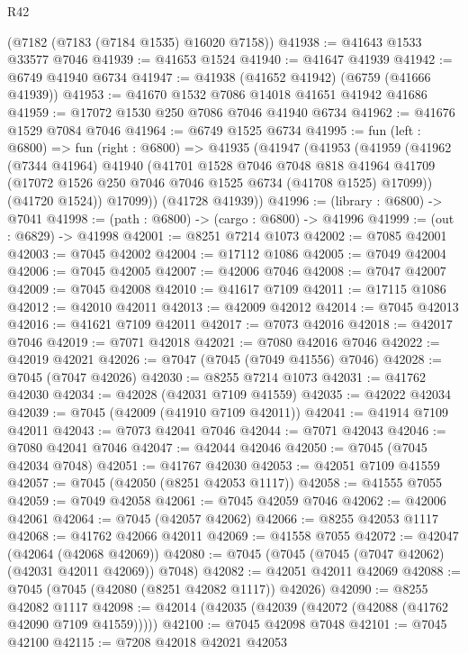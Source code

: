 \begin{lexlean}{R42}
\begin{coremodule}
{    (@7182 (@7183 (@7184 @1535) @16020 @7158))
@41938 := @41643 @1533 @33577 @7046
@41939 := @41653 @1524
@41940 := @41647 @41939
@41942 := @6749 @41940 @6734
@41947 := @41938 (@41652 @41942) (@6759 (@41666 @41939))
@41953 := @41670 @1532 @7086 @14018 @41651 @41942 @41686
@41959 := @17072 @1530 @250 @7086 @7046 @41940 @6734
@41962 := @41676 @1529 @7084 @7046
@41964 := @6749 @1525 @6734
@41995 := fun (left : @6800) =>
  fun (right : @6800) =>
  @41935
    (@41947
      (@41953
        (@41959
          (@41962
            (@7344 @41964)
            @41940
            (@41701
              @1528
              @7046
              @7048
              @818
              @41964
              @41709
              (@17072 @1526 @250 @7046 @7046 @1525 @6734 (@41708 @1525) @17099))
            (@41720 @1524))
          @17099))
      (@41728 @41939))
@41996 := (library : @6800) -> @7041
@41998 := (path : @6800) -> (cargo : @6800) -> @41996
@41999 := (out : @6829) -> @41998
@42001 := @8251 @7214 @1073
@42002 := @7085 @42001
@42003 := @7045 @42002
@42004 := @17112 @1086
@42005 := @7049 @42004
@42006 := @7045 @42005
@42007 := @42006 @7046
@42008 := @7047 @42007
@42009 := @7045 @42008
@42010 := @41617 @7109
@42011 := @17115 @1086
@42012 := @42010 @42011
@42013 := @42009 @42012
@42014 := @7045 @42013
@42016 := @41621 @7109 @42011
@42017 := @7073 @42016
@42018 := @42017 @7046
@42019 := @7071 @42018
@42021 := @7080 @42016 @7046
@42022 := @42019 @42021
@42026 := @7047 (@7045 (@7049 @41556) @7046)
@42028 := @7045 (@7047 @42026)
@42030 := @8255 @7214 @1073
@42031 := @41762 @42030
@42034 := @42028 (@42031 @7109 @41559)
@42035 := @42022 @42034
@42039 := @7045 (@42009 (@41910 @7109 @42011))
@42041 := @41914 @7109 @42011
@42043 := @7073 @42041 @7046
@42044 := @7071 @42043
@42046 := @7080 @42041 @7046
@42047 := @42044 @42046
@42050 := @7045 (@7045 @42034 @7048)
@42051 := @41767 @42030
@42053 := @42051 @7109 @41559
@42057 := @7045 (@42050 (@8251 @42053 @1117))
@42058 := @41555 @7055
@42059 := @7049 @42058
@42061 := @7045 @42059 @7046
@42062 := @42006 @42061
@42064 := @7045 (@42057 @42062)
@42066 := @8255 @42053 @1117
@42068 := @41762 @42066 @42011
@42069 := @41558 @7055
@42072 := @42047 (@42064 (@42068 @42069))
@42080 := @7045 (@7045 (@7045 (@7047 @42062) (@42031 @42011 @42069)) @7048)
@42082 := @42051 @42011 @42069
@42088 := @7045 (@7045 (@42080 (@8251 @42082 @1117)) @42026)
@42090 := @8255 @42082 @1117
@42098 := @42014 (@42035 (@42039 (@42072 (@42088 (@41762 @42090 @7109 @41559)))))
@42100 := @7045 @42098 @7048
@42101 := @7045 @42100
@42115 := @7208
    @42018
    @42021
    @42053
}
\end{coremodule}
\end{lexlean}
